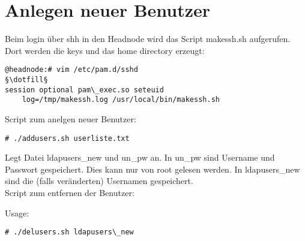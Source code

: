 \section{Anlegen neuer Benutzer}
Beim login über shh in den Headnode wird das Script makessh.sh aufgerufen.
Dort werden die keys und das home directory erzeugt:
\begin{lstlisting}[style=Bash]
@headnode:# vim /etc/pam.d/sshd
§\dotfill§
session optional pam\_exec.so seteuid 
    log=/tmp/makessh.log /usr/local/bin/makessh.sh
\end{lstlisting}
Script zum anelgen neuer Benutzer:

\begin{lstlisting}[style=Bash]
# ./addusers.sh userliste.txt 
\end{lstlisting}
Legt Datei ldapusers\_new und un\_pw an.
In un\_pw sind Username und Passwort gespeichert. Dies kann nur von root gelesen werden. In ldapusers\_new sind die (falls veränderten) Usernamen gespeichert.\\
Script zum entfernen der Benutzer:

Usage:
\begin{lstlisting}[style=Bash]
# ./delusers.sh ldapusers\_new
\end{lstlisting}
